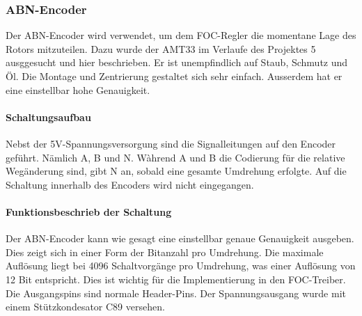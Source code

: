 \subsubsection{ABN-Encoder}
\label{subsubsec:ABN-Encoder}

Der ABN-Encoder wird verwendet, um dem FOC-Regler die momentane Lage des Rotors mitzuteilen. Dazu wurde der AMT33 im Verlaufe des Projektes 5 ausggesucht und hier beschrieben. Er ist unempfindlich auf Staub, Schmutz und Öl. Die Montage und Zentrierung gestaltet sich sehr einfach. Ausserdem hat er eine einstellbar hohe Genauigkeit.

\paragraph{Schaltungsaufbau}\mbox{}

Nebst der 5V-Spannungsversorgung sind die Signalleitungen auf den Encoder geführt. Nämlich A, B und N. Wàhrend A und B die Codierung für die relative Wegänderung sind, gibt N an, sobald eine gesamte Umdrehung erfolgte. Auf die Schaltung innerhalb des Encoders wird nicht eingegangen.

\paragraph{Funktionsbeschrieb der Schaltung}\mbox{}

Der ABN-Encoder kann wie gesagt eine einstellbar genaue Genauigkeit ausgeben. Dies zeigt sich in einer Form der Bitanzahl pro Umdrehung. Die maximale Auflösung liegt bei 4096 Schaltvorgänge pro Umdrehung, was einer Auflösung von 12 Bit entspricht. Dies ist wichtig für die Implementierung in den FOC-Treiber. Die Ausgangspins sind normale Header-Pins. Der Spannungsausgang wurde mit einem Stützkondesator C89 versehen.

